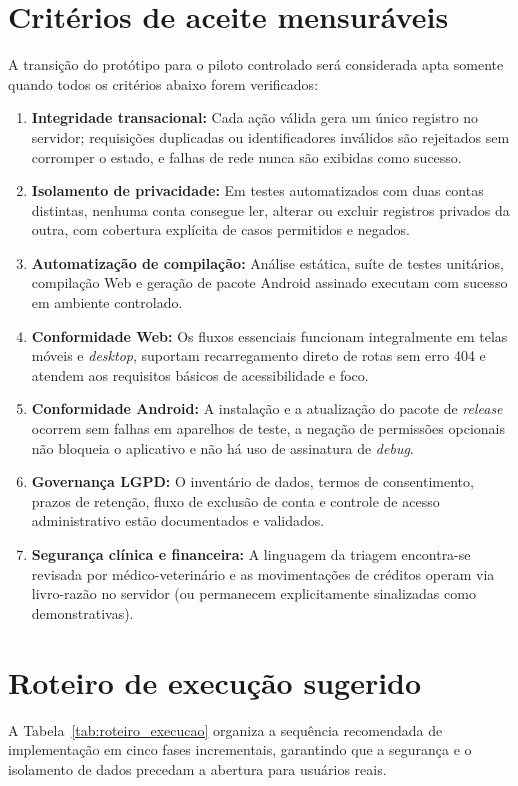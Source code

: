 \documentclass[12pt,a4paper]{article}
\begin{document}
\section{Critérios de aceite mensuráveis}
A transição do protótipo para o piloto controlado será considerada apta somente quando todos os critérios abaixo forem verificados:
\begin{enumerate}[leftmargin=*]
\item \textbf{Integridade transacional:} Cada ação válida gera um único registro no servidor; requisições duplicadas ou identificadores inválidos são rejeitados sem corromper o estado, e falhas de rede nunca são exibidas como sucesso.
\item \textbf{Isolamento de privacidade:} Em testes automatizados com duas contas distintas, nenhuma conta consegue ler, alterar ou excluir registros privados da outra, com cobertura explícita de casos permitidos e negados.
\item \textbf{Automatização de compilação:} Análise estática, suíte de testes unitários, compilação Web e geração de pacote Android assinado executam com sucesso em ambiente controlado.
\item \textbf{Conformidade Web:} Os fluxos essenciais funcionam integralmente em telas móveis e \textit{desktop}, suportam recarregamento direto de rotas sem erro 404 e atendem aos requisitos básicos de acessibilidade e foco.
\item \textbf{Conformidade Android:} A instalação e a atualização do pacote de \textit{release} ocorrem sem falhas em aparelhos de teste, a negação de permissões opcionais não bloqueia o aplicativo e não há uso de assinatura de \textit{debug}.
\item \textbf{Governança LGPD:} O inventário de dados, termos de consentimento, prazos de retenção, fluxo de exclusão de conta e controle de acesso administrativo estão documentados e validados.
\item \textbf{Segurança clínica e financeira:} A linguagem da triagem encontra-se revisada por médico-veterinário e as movimentações de créditos operam via livro-razão no servidor (ou permanecem explicitamente sinalizadas como demonstrativas).
\end{enumerate}

\section{Roteiro de execução sugerido}
A Tabela~\ref{tab:roteiro_execucao} organiza a sequência recomendada de implementação em cinco fases incrementais, garantindo que a segurança e o isolamento de dados precedam a abertura para usuários reais.
\end{document}
